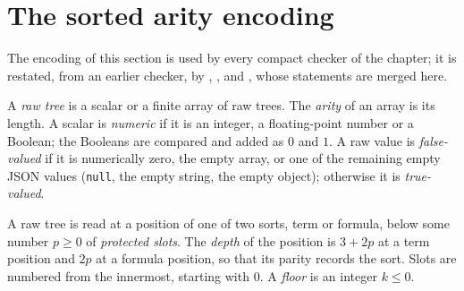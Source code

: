 \section{The sorted arity encoding}\label{cert:sec:codec}

The encoding of this section is used by every compact checker of the chapter;
it is restated, from an earlier checker, by ,
,  and
, whose statements are merged here.

\begin{definition}\label{cert:def:raw}
A \emph{raw tree} is a scalar or a finite array of raw trees. The
\emph{arity} of an array is its length. A scalar is \emph{numeric} if it is an
integer, a floating-point number or a Boolean; the Booleans are compared and
added as $0$ and $1$. A raw value is \emph{false-valued} if it is numerically
zero, the empty array, or one of the remaining empty JSON values (\texttt{null},
the empty string, the empty object); otherwise it is \emph{true-valued}.
\end{definition}

A raw tree is read at a position of one of two sorts, term or formula, below
some number $p\ge 0$ of \emph{protected slots}. The \emph{depth} of the
position is $3+2p$ at a term position and $2p$ at a formula position, so that
its parity records the sort. Slots are numbered from the innermost, starting
with $0$. A \emph{floor} is an integer $k\le 0$.

